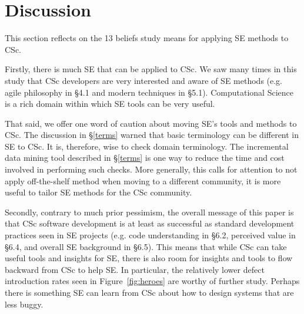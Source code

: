\documentclass[conference,10pt]{IEEEtran}
\begin{document}


\section{Discussion}
This section reflects on the 13 beliefs study means for
applying SE methods to CSc.

Firstly, there is much SE that can be applied to CSc. We saw many times in this study that CSc developers are very interested and aware of SE methods (e.g. agile philosophy in \S4.1 and modern techniques in \S5.1). Computational Science is a rich domain within which SE tools can be very useful.

That said,  we offer one word of caution about moving SE's tools and methods to CSc. The discussion in \S\ref{terms} warned that basic terminology can be different in SE to CSc. It is, therefore, wise to check domain terminology. The incremental data mining tool described in \S\ref{terms} is one way to reduce the time and cost
involved in performing such checks. More generally, this calls for attention to not apply off-the-shelf method when moving to a different community, it is more useful to tailor SE methods for the CSc community.

Secondly, contrary to much prior pessimism, the overall message of this paper is that CSc software development is at least as successful as standard development practices seen in SE projects (e.g. code understanding in \S6.2, perceived value in \S6.4, and overall SE background in \S6.5). This means that while CSc can take useful tools and insights for SE, there is also room for insights and tools to flow backward from CSc to help SE.
In particular, the relatively lower defect introduction rates seen in Figure~\ref{fig:heroes} are worthy of further study. Perhaps there is something SE can learn from CSc about how to design systems that are less buggy.

\end{document}

